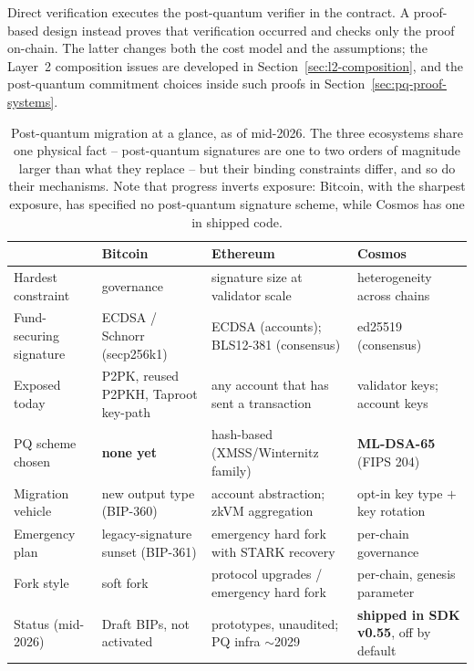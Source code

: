 Direct verification executes the post-quantum verifier in the contract. A
proof-based design instead proves that verification occurred and checks only the
proof on-chain. The latter changes both the cost model and the assumptions; the
Layer~2 composition issues are developed in Section~\ref{sec:l2-composition}, and
the post-quantum commitment choices inside such proofs in
Section~\ref{sec:pq-proof-systems}.

\begin{table}[H]
\centering
\small
\begin{tabular}{@{}p{2.5cm}p{3.6cm}p{4.0cm}p{4.0cm}@{}}
\toprule
 & \textbf{Bitcoin} & \textbf{Ethereum} & \textbf{Cosmos} \\
\midrule
Hardest constraint & governance & signature size at validator scale & heterogeneity across chains \\
Fund-securing signature & ECDSA / Schnorr (secp256k1) & ECDSA (accounts); BLS12-381 (consensus) & ed25519 (consensus) \\
Exposed today & P2PK, reused P2PKH, Taproot key-path & any account that has sent a transaction & validator keys; account keys \\
PQ scheme chosen & \textbf{none yet} & hash-based (XMSS/Winternitz family) & \textbf{ML-DSA-65} (FIPS 204) \\
Migration vehicle & new output type (BIP-360) & account abstraction; zkVM aggregation & opt-in key type $+$ key rotation \\
Emergency plan & legacy-signature sunset (BIP-361) & emergency hard fork with STARK recovery & per-chain governance \\
Fork style & soft fork & protocol upgrades / emergency hard fork & per-chain, genesis parameter \\
Status (mid-2026) & Draft BIPs, not activated & prototypes, unaudited; PQ infra $\sim$2029 & \textbf{shipped in SDK v0.55}, off by default \\
\bottomrule
\end{tabular}
\caption{Post-quantum migration at a glance, as of mid-2026. The three ecosystems share one physical fact -- post-quantum signatures are one to two orders of magnitude larger than what they replace -- but their binding constraints differ, and so do their mechanisms. Note that progress inverts exposure: Bitcoin, with the sharpest exposure, has specified no post-quantum signature scheme, while Cosmos has one in shipped code.}
\label{tab:chain-migration}
\end{table}


